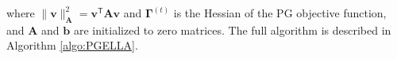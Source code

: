 \documentclass{aamas2016}
\newcommand{\transpose}{\text{$\mathsf{T}$}}
\newcommand{\st}[1]{\bm{s}^{(#1)}}
\begin{document}
where $\|\boldsymbol{v}\|_{\boldsymbol{A}}^{2}=\boldsymbol{v}^{\transpose}\boldsymbol{A}\boldsymbol{v}$ and $\boldsymbol{\Gamma}^{(t)}$ is 
the Hessian of the PG objective function, and $\boldsymbol{A}$ and $\boldsymbol{b}$ are initialized to zero matrices. The full algorithm is described in Algorithm \ref{algo:PGELLA}.


\end{document}
